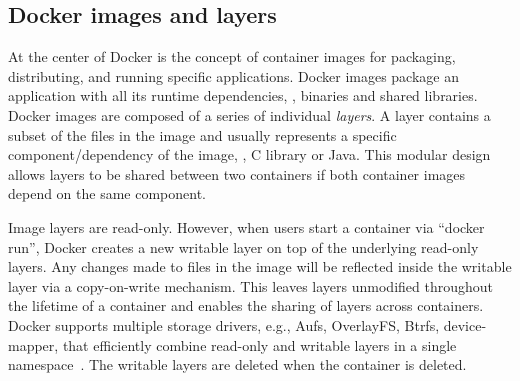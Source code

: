 


\subsection{Docker images and layers}
\label{sec-image-layers}

At the center of Docker is the concept of container images for packaging,
distributing, and running specific applications.
%
%
%
Docker images package an application with all its runtime dependencies, \eg,
binaries and shared libraries.
Docker images are composed of a series of individual \emph{layers}.
A layer contains a subset of the files in the image and 
usually represents a specific component/dependency of the image, \eg, C library or
Java. This modular design allows layers to be shared between two containers if both
container images depend on the same component. 


Image layers are read-only. However, when users start a
container via ``docker run'', Docker creates a new writable layer on top of the
underlying read-only layers. Any changes made to files in the image will be
reflected inside the writable layer via a copy-on-write mechanism. This leaves layers
unmodified throughout the lifetime of a container and enables the sharing of
layers across containers.
Docker supports multiple storage drivers, e.g., Aufs, OverlayFS, Btrfs,
device-mapper, that efficiently combine read-only and writable layers
in a single namespace~\cite{docker-driver-eval}.
The writable layers are deleted when the container is deleted.
 

